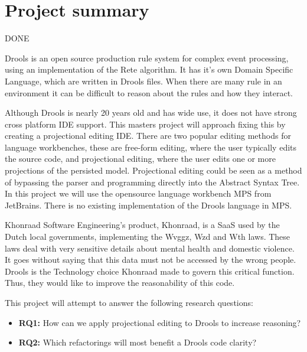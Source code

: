\section{Project summary}
{\LARGE DONE}

Drools is an open source production rule system for complex event processing, using an implementation of the Rete algorithm.
It has it's own Domain Specific Language, which are written in Drools files.
When there are many rule in an environment it can be difficult to reason about the rules and how they interact.


Although Drools is nearly 20 years old and has wide use, it does not have strong cross platform IDE support.
This masters project will approach fixing this by creating a projectional editing IDE.
There are two popular editing methods for language workbenches, these are free-form editing, where the user typically edits the source code, and projectional editing,
where the user edits one or more projections of the persisted model\cite{erdweg2013state}.
Projectional editing could be seen as a method of bypassing the parser and programming directly into the Abstract Syntax Tree.
In this project we will use the opensource language workbench MPS from JetBrains\cite{MPS_ProductPage}.
There is no existing implementation of the Drools language in MPS.


Khonraad Software Engineering's product, Khonraad, is a SaaS used by the Dutch local governments, implementing the Wvggz, Wzd and Wth laws. 
These laws deal with very sensitive details about mental health and domestic violence.
It goes without saying that this data must not be accessed by the wrong people.
Drools is the Technology choice Khonraad made to govern this critical function.
Thus, they would like to improve the reasonability of this code.


This project will attempt to answer the following research questions:
\begin{itemize}
    \item \textbf{RQ1:} How can we apply projectional editing to Drools to increase reasoning?  
    \item \textbf{RQ2:} Which refactorings will most benefit a Drools code clarity?
\end{itemize}